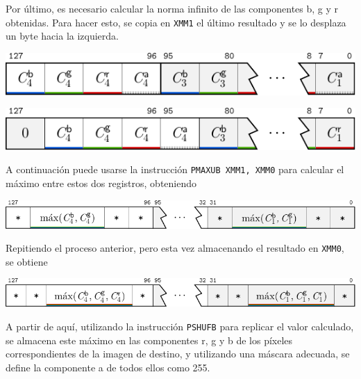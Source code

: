       Por último, es necesario calcular la norma infinito de las componentes \textsf{b}, \textsf{g} y \textsf{r} obtenidas. Para hacer esto, se copia en \texttt{XMM1} el último resultado y se lo desplaza un byte hacia la izquierda.

      \begin{center}
         \includegraphics{imagenes/diff-registros-3.pdf}

         \includegraphics{imagenes/diff-registros-4.pdf}
      \end{center}

      A continuación puede usarse la instrucción \texttt{PMAXUB XMM1, XMM0} para calcular el máximo entre estos dos registros, obteniendo 

      \begin{center}
         \includegraphics{imagenes/diff-registros-5.pdf}
      \end{center}

      Repitiendo el proceso anterior, pero esta vez almacenando el resultado en \texttt{XMM0}, se obtiene

      \begin{center}
         \includegraphics{imagenes/diff-registros-6.pdf}
      \end{center}

      A partir de aquí, utilizando la instrucción \texttt{PSHUFB} para replicar el valor calculado, se almacena este máximo en las componentes \textsf{r}, \textsf{g} y \textsf{b} de los píxeles correspondientes de la imagen de destino, y utilizando una máscara adecuada, se define la componente \textsf{a} de todos ellos como 255.


